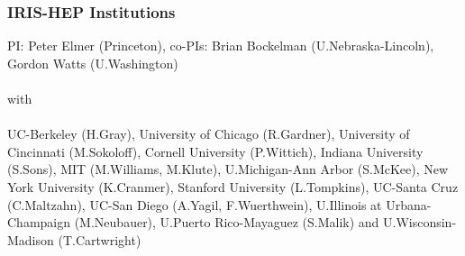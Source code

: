 \begin{frame}
\frametitle{IRIS-HEP Institutions}

PI: Peter Elmer (Princeton), co-PIs: Brian Bockelman (U.Nebraska-Lincoln), Gordon Watts (U.Washington) 
~~ \\
~~ \\
with
~~ \\
~~ \\
UC-Berkeley (H.Gray), University of Chicago (R.Gardner), University of Cincinnati (M.Sokoloff), Cornell University (P.Wittich), Indiana University (S.Sons), MIT (M.Williams, M.Klute), U.Michigan-Ann Arbor (S.McKee), New York University (K.Cranmer), Stanford University (L.Tompkins), UC-Santa Cruz (C.Maltzahn), UC-San Diego (A.Yagil, F.Wuerthwein), U.Illinois at Urbana-Champaign (M.Neubauer), U.Puerto Rico-Mayaguez (S.Malik) and U.Wisconsin-Madison (T.Cartwright)

\end{frame}


